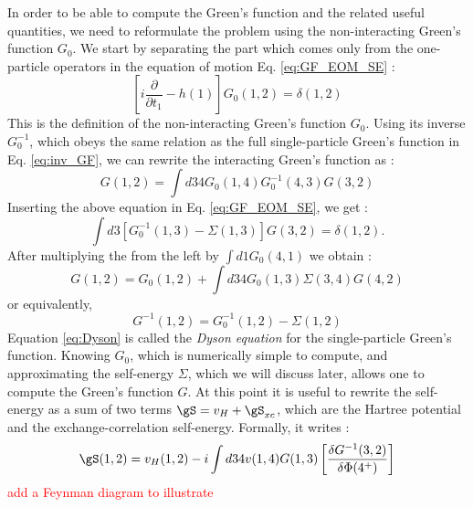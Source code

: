 In order to be able to compute the Green's function and the related useful quantities, we need to reformulate the problem using the non-interacting Green's function $G_0$. We start by separating the part which comes only from the one-particle operators in the equation of motion Eq. \eqref{eq:GF_EOM_SE} :
\begin{equation}
	\left[ i\frac{\partial}{\partial t_1} - h(1) \right] G_0(1,2) = \delta(1,2)
\end{equation}
This is the definition of the non-interacting Green's function $G_0$. Using its inverse $G_0^{-1}$, which obeys the same relation as the full single-particle Green's function in Eq. \eqref{eq:inv_GF}, we can rewrite the interacting Green's function as :
\begin{equation}
	G(1,2) = \int d34 G_0(1,4)G^{-1}_0(4,3)G(3,2)
\end{equation}
Inserting the above equation in Eq. \eqref{eq:GF_EOM_SE}, we get :
\begin{equation}
	\int d3 \left[ G_0^{-1}(1,3) - \Sigma(1,3) \right] G(3,2) = \delta(1,2).
\end{equation}
After multiplying the from the left by $\int d1 G_0(4,1)$ we obtain :
\begin{equation}
	G(1,2) = G_0(1,2) + \int d34 G_0(1,3) \Sigma(3,4) G(4,2) \label{eq:Dyson}
\end{equation}
or equivalently,
\begin{equation}
	G^{-1}(1,2) = G_0^{-1}(1,2) - \Sigma(1,2)
\end{equation}
Equation \eqref{eq:Dyson} is called the \textit{Dyson equation} for the single-particle Green's function. Knowing $G_0$, which is numerically simple to compute, and approximating the self-energy $\Sigma$, which we will discuss later, allows one to compute the Green's function $G$. At this point it is useful to rewrite the self-energy as a sum of two terms $\gS = v_H + \gS_{xc}$, which are the Hartree potential and the exchange-correlation self-energy. Formally, it writes :
\begin{equation}
	\gS(1,2) = v_H(1,2) - i\int d34 v(1,4)G(1,3) \left[ \frac{\delta G^{-1}(3,2)}{\delta \Phi(4^+)} \right] 
\end{equation}
\textcolor{red}{add a Feynman diagram to illustrate}
%
